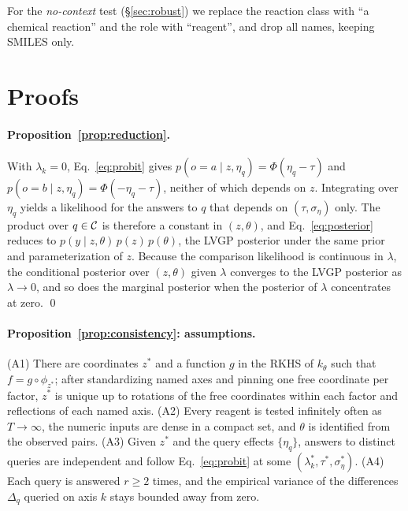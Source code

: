 For the \emph{no-context} test (\S\ref{sec:robust}) we replace the reaction class with ``a chemical reaction'' and the role with ``reagent'', and drop all names, keeping SMILES only.

\section{Proofs}
\label{app:proofs}

\paragraph{Proposition~\ref{prop:reduction}.}
With $\lambda_k=0$, Eq.~\eqref{eq:probit} gives $p(o{=}a\mid z,\eta_q)=\Phi(\eta_q-\tau)$ and $p(o{=}b\mid z,\eta_q)=\Phi(-\eta_q-\tau)$, neither of which depends on $z$. Integrating over $\eta_q$ yields a likelihood for the answers to $q$ that depends on $(\tau,\sigma_\eta)$ only. The product over $q\in\mathcal{C}$ is therefore a constant in $(z,\theta)$, and Eq.~\eqref{eq:posterior} reduces to $p(y\mid z,\theta)\,p(z)\,p(\theta)$, the LVGP posterior under the same prior and parameterization of $z$. Because the comparison likelihood is continuous in $\lambda$, the conditional posterior over $(z,\theta)$ given $\lambda$ converges to the LVGP posterior as $\lambda\to0$, and so does the marginal posterior when the posterior of $\lambda$ concentrates at zero. \qed

\paragraph{Proposition~\ref{prop:consistency}: assumptions.}
(A1) There are coordinates $z^\ast$ and a function $g$ in the RKHS of $k_\theta$ such that $f=g\circ\phi_{z^\ast}$; after standardizing named axes and pinning one free coordinate per factor, $z^\ast$ is unique up to rotations of the free coordinates within each factor and reflections of each named axis. (A2) Every reagent is tested infinitely often as $T\to\infty$, the numeric inputs are dense in a compact set, and $\theta$ is identified from the observed pairs. (A3) Given $z^\ast$ and the query effects $\{\eta_q\}$, answers to distinct queries are independent and follow Eq.~\eqref{eq:probit} at some $(\lambda_k^\ast,\tau^\ast,\sigma_\eta^\ast)$. (A4) Each query is answered $r\ge2$ times, and the empirical variance of the differences $\Delta_q$ queried on axis $k$ stays bounded away from zero.

